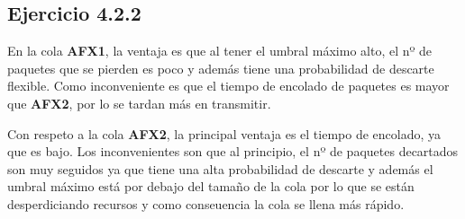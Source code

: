 \subsection{Ejercicio 4.2.2}

En la cola \textbf{AFX1}, la ventaja es que al tener el umbral máximo alto, el nº de paquetes que se pierden es poco y además tiene una probabilidad
de descarte flexible. Como inconveniente es que el tiempo de encolado de paquetes es mayor que \textbf{AFX2}, por lo se tardan más en transmitir.

Con respeto a la cola \textbf{AFX2}, la principal ventaja es el tiempo de encolado, ya que es bajo. 
Los inconvenientes son que al principio, el nº de paquetes decartados son muy seguidos ya que tiene una alta probabilidad de descarte y además el
umbral máximo está por debajo del tamaño de la cola por lo que se están desperdiciando recursos y como conseuencia la cola se llena más rápido.
 

